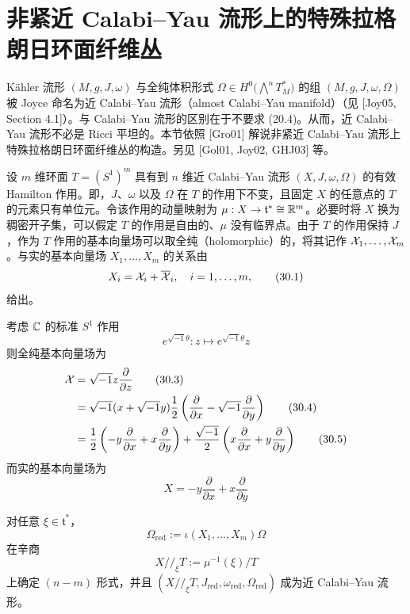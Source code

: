 \section{非紧近 Calabi–Yau 流形上的特殊拉格朗日环面纤维丛}

Kähler 流形 $(M,g,J,\omega)$ 与全纯体积形式 $\Omega \in H^0\big(\bigwedge^n T^*_M\big)$ 的组 $(M,g,J,\omega,\Omega)$ 被 Joyce 命名为近 Calabi–Yau 流形（almost Calabi–Yau manifold）（见 [Joy05, Section 4.1]）。与 Calabi–Yau 流形的区别在于不要求 (20.4)。从而，近 Calabi–Yau 流形不必是 Ricci 平坦的。本节依照 [Gro01] 解说非紧近 Calabi–Yau 流形上特殊拉格朗日环面纤维丛的构造。另见 [Gol01, Joy02, GHJ03] 等。

设 $m$ 维环面 $T = (S^1)^m$ 具有到 $n$ 维近 Calabi–Yau 流形 $(X,J,\omega,\Omega)$ 的有效 Hamilton 作用。即，$J$、$\omega$ 以及 $\Omega$ 在 $T$ 的作用下不变，且固定 $X$ 的任意点的 $T$ 的元素只有单位元。令该作用的动量映射为 $\mu: X \to \mathfrak{t}^* \cong \mathbb{R}^m$。必要时将 $X$ 换为稠密开子集，可以假定 $T$ 的作用是自由的、$\mu$ 没有临界点。由于 $T$ 的作用保持 $J$，作为 $T$ 作用的基本向量场可以取全纯（holomorphic）的，将其记作 $\mathcal{X}_1,\dots,\mathcal{X}_m$。与实的基本向量场 $X_1,\dots,X_m$ 的关系由
\begin{equation}
  X_i = \mathcal{X}_i + \overline{\mathcal{X}}_i, \quad i = 1,\dots,m, \tag{30.1}
\end{equation}
给出。

\begin{example}
考虑 $\mathbb{C}$ 的标准 $S^1$ 作用
\begin{equation}
  e^{\sqrt{-1}\theta} : z \mapsto e^{\sqrt{-1}\theta}z \tag{30.2}
\end{equation}
则全纯基本向量场为
\begin{align}
  \mathcal{X} &= \sqrt{-1}z\frac{\partial}{\partial z} \tag{30.3}\\
  &= \sqrt{-1}(x + \sqrt{-1}y)\frac{1}{2}
    \left(\frac{\partial}{\partial x} - \sqrt{-1}\frac{\partial}{\partial y}\right) \tag{30.4}\\
  &= \frac{1}{2}\left(-y\frac{\partial}{\partial x} + x\frac{\partial}{\partial y}\right)
    + \frac{\sqrt{-1}}{2}\left(x\frac{\partial}{\partial x} + y\frac{\partial}{\partial y}\right) \tag{30.5}
\end{align}
而实的基本向量场为
\begin{equation}
  X = -y\frac{\partial}{\partial x} + x\frac{\partial}{\partial y} \tag{30.6}
\end{equation}
\end{example}

\begin{theorem}
对任意 $\xi \in \mathfrak{t}^*$，
\begin{equation}
  \Omega_{\mathrm{red}} := \iota(X_1,\dots,X_m)\Omega \tag{30.7}
\end{equation}
在辛商
\begin{equation}
  X/\!/_{\xi}T := \mu^{-1}(\xi)/T \tag{30.8}
\end{equation}
上确定 $(n-m)$ 形式，并且 $(X/\!/_{\xi}T, J_{\mathrm{red}}, \omega_{\mathrm{red}},
\Omega_{\mathrm{red}})$ 成为近 Calabi–Yau 流形。
\end{theorem}


